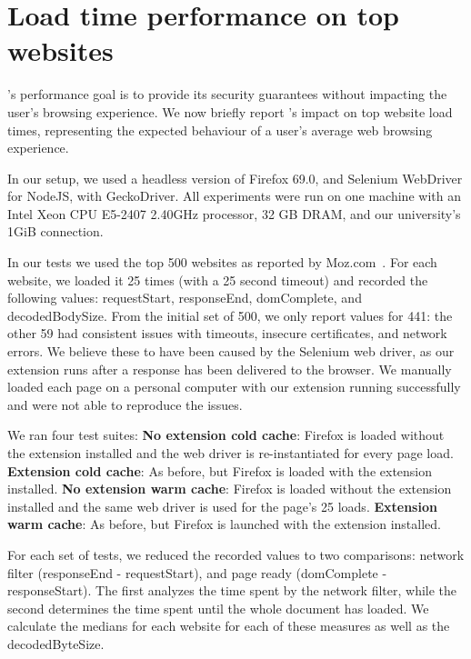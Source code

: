 \section{Load time performance on top websites} \label{performance}

\sys's performance goal is to provide its security guarantees without
impacting the user's browsing experience. We now briefly report \sys's
impact on top website load times, representing the expected behaviour
of a user's average web browsing experience.

% 
In our setup, we used a headless version of Firefox 69.0, and
Selenium WebDriver for NodeJS, with GeckoDriver. All experiments were
run on one machine with an Intel Xeon CPU E5-2407 2.40GHz processor,
32 GB DRAM, and our university's 1GiB connection.

In our tests we used the top 500 websites as
reported by Moz.com~\cite{top500}. For each website, we loaded it 25
times (with a 25 second timeout) and recorded the following values:
requestStart, responseEnd, domComplete, and decodedBodySize. From the
initial set of 500, we only report values for 441: the other 59 had
consistent issues with timeouts, insecure certificates, and network
errors. We believe these to have been caused by the Selenium web driver,
as our extension runs after a response has been
delivered to the browser. We manually loaded each page
on a personal computer with our extension running successfully and 
were not able to reproduce the issues.

We ran four test suites:
\textbf{No extension cold cache}: Firefox is loaded without the extension installed and the web driver is re-instantiated for every page load.
\textbf{Extension cold cache}: As before, but Firefox is loaded with the extension installed.
\textbf{No extension warm cache}: Firefox is loaded without the extension installed and the same web driver is used for the page's 25 loads.
\textbf{Extension warm cache}: As before, but Firefox is launched with the extension installed.

For each set of tests, we reduced the recorded values to two comparisons: network filter (responseEnd - requestStart), and page ready (domComplete - responseStart). The first analyzes the time spent by the network filter, while the second determines the time spent until the whole document has loaded. We calculate the medians for each website for each of these measures as well as the decodedByteSize.

